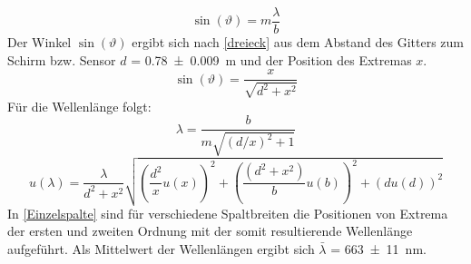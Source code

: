 \documentclass[
	a4paper,
	12pt,
	pagesize,
	ngerman
]{scrartcl}
\begin{document}
	\begin{equation}
		\sin(\vartheta) = m \frac{\lambda}{b}
		\label{einzelminmax}
	\end{equation}
	Der Winkel $\sin(\vartheta)$ ergibt sich nach \cref{dreieck} aus dem Abstand des Gitters zum Schirm bzw. Sensor $d$ = \SI{0,78 +- 0,009}{m} und der Position des Extremas $x$. 
	\begin{equation}
		\sin(\vartheta) = \frac{x}{\sqrt{d^2 + x^2}}
		\label{dreieck}
	\end{equation}
	Für die Wellenlänge folgt:
	\begin{equation}
		\lambda = \frac{b}{m\sqrt{(d/x)^2 + 1}}
	\end{equation}
	\begin{equation}
	u(\lambda) = \frac{\lambda}{d^2+x^2} \sqrt{\left( \frac{d^2}{x} u(x)\right)^2 + \left( \frac{(d^2+ x^2)}{b}u(b) \right) ^2 + \left( du(d) \right)^2}
	\end{equation}
	In \cref{Einzelspalte} sind für verschiedene Spaltbreiten die Positionen von Extrema der ersten und zweiten Ordnung mit der somit resultierende Wellenlänge aufgeführt.
	Als Mittelwert der Wellenlängen ergibt sich $\bar{\lambda}$ = \SI{663 +- 11}{nm}.
	
\end{document}

